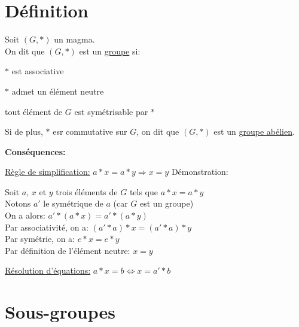\documentclass[12pt,twoside,a4paper]{article}
\author{MPSI 2}
\begin{document}
	\maketitle
	\section{D\'efinition}
		\begin{defi}
			Soit $(G,*)$ un magma.\\
			On dit que $(G,*)$ est un \underline{groupe} si:
			\begin{liste}
				\item $*$ est associative
				\item $*$ admet un \'el\'ement neutre
				\item tout \'el\'ement de $G$ est sym\'etrisable par $*$
			\end{liste}
			Si de plus, $*$ esr commutative sur $G$, on dit que $(G,*)$ est un \underline{groupe ab\'elien}.
		\end{defi}
		\begin{flushleft}
			\textbf{Cons\'equences:}
			\begin{liste}
				\item\underline{R\`egle de simplification:} $a*x=a*y\Rightarrow x=y$
					D\'emonstration:
					\begin{tab}
						Soit $a$, $x$ et $y$ trois \'el\'ements de $G$ tels que $a*x=a*y$\\
						Notons $a'$ le sym\'etrique de $a$ (car $G$ est un groupe)\\
						On a alors: $a'*(a*x)=a'*(a*y)$\\
						Par associativit\'e, on a: $(a'*a)*x=(a'*a)*y$\\
						Par sym\'etrie, on a: $e*x=e*y$\\
						Par d\'efinition de l'\'el\'ement neutre: $x=y$						
					\end{tab}
				\item\underline{R\'esolution d'\'equations:} $a*x=b\iff x=a'*b$
			\end{liste}
		\end{flushleft}
	\section{Sous-groupes}
\end{document}
